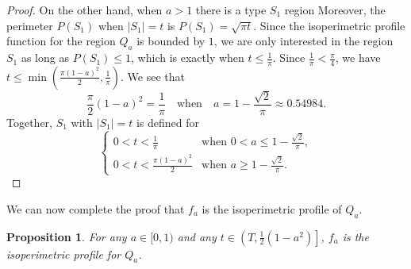 \documentclass[leqno]{article}
\numberwithin{equation}{section}
\theoremstyle{definition}
\theoremstyle{remark}
\theoremstyle{plain}
\newtheorem{proposition}[equation]{Proposition}
\begin{document}
\begin{proof}
On the other hand, when $a>1$ there is a type $S_1$ region Moreover, the perimeter $P(S_1)$ when $|S_1|=t$ is $P(S_1)=\sqrt{\pi t}$. Since the isoperimetric profile function for the region $Q_a$ is bounded by $1$, we are only interested in the region $S_1$ as long as $P(S_1)\leq 1$, which is exactly when $t\leq \tfrac{1}{\pi}$. Since $\tfrac{1}{\pi}<\tfrac{\pi}{4}$, we have $t\leq\min(\tfrac{\pi(1-a)^2}{2},\tfrac{1}{\pi})$. We see that
\begin{equation}
\frac{\pi}{2}(1-a)^2=\frac{1}{\pi}\quad\textrm{when}\quad a=1-\frac{\sqrt{2}}{\pi}\approx 0.54984.
\end{equation}
Together, $S_1$ with $|S_1|=t$ is defined for
\begin{equation} 
\begin{cases}
0<t<\tfrac{1}{\pi} & \textrm{when }0<a\leq 1-\tfrac{\sqrt{2}}{\pi},\\
0<t<\tfrac{\pi(1-a)^2}{2} & \textrm{when }a\geq 1-\tfrac{\sqrt{2}}{\pi}.
\end{cases}
\end{equation} 


\fi

\end{proof}

We can now complete the proof that $f_a$ is the isoperimetric profile of $Q_a$.

\begin{proposition}For any $a \in [0,1)$ and any $t \in \left(T, \frac{1}{2}(1-a^2)\right]$, $f_a$ is the isoperimetric profile for $Q_a$.

\end{proposition}
\end{document}
